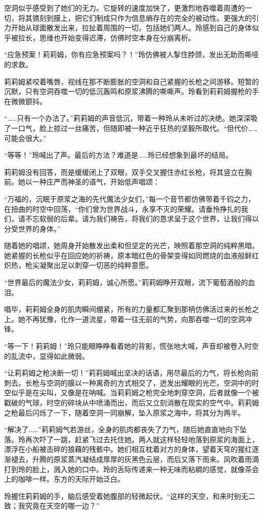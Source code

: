空洞似乎感受到了她们的无力。它旋转的速度加快了，更激烈地吞噬着周遭的一切，将其镌刻到膜上，把它们制成只作为信息熵存在的完全的被动性。更强大的引力开始从球面散发出来，拉扯着周围的一切，包括她们两人。玲感到自己的身体似乎被拉长，思维也开始变得迟滞，仿佛时空本身在分崩离析。

“应急预案！莉莉姆，你有应急预案吗？！”玲仿佛被人掣住脖颈，发出无助而嘶哑的求救。

莉莉姆紧咬着嘴唇，视线在那不断膨胀的空洞和自己紧握的长枪之间游移。短暂的沉默，只有空洞吞噬一切的低沉轰鸣和原浆沸腾的嘶嘶声。玲看到莉莉姆握枪的手在微微颤抖。

“……只有一个办法了。”莉莉姆的声音低沉，带着一种玲从未听过的决绝。她深深吸了一口气，脸上掠过一丝痛苦，但随即被一种近乎狂热的坚毅所取代。“但代价……可能会很大。”

“等等！”玲喊出了声。最后的方法？难道是……玲已经想象到最坏的结局。

莉莉姆没有回答，而是缓缓闭上了双眼，双手交叉握住赤红长枪，将其竖立在胸前。她以一种庄严而神圣的语气，开始低声唱颂：

“万福的，沉眠于原浆之海的先代魔法少女们，”每一个音节都仿佛带着千钧之力，在扭曲的时空中回荡，“你们曾为世界战斗，永享不灭的荣耀。请垂怜挣扎的我们，请不忘软弱的后辈。请为我们祷告，将我们的恳求呈于这个世界，让我们得以分受世界的身体。”

随着她的唱颂，她周身开始散发出柔和但坚定的光芒，映照着那空洞的纯粹黑暗。她紧握的长枪似乎在回应她的祈祷，原本暗红色的骨架变得如同燃烧的血液般鲜红炽热，枪尖凝聚出足以刺穿一切恶的纯粹意愿。

“世界最后的魔法少女，莉莉姆，诚心所愿。”莉莉姆睁开双眼，流下葡萄酒般的血泪。

唱毕，莉莉姆全身的肌肉瞬间绷紧，所有的力量都汇聚到那柄仿佛活过来的长枪之上。她不再犹豫，化作一道流星，带着一往无前的气势，向那吞噬一切的空洞冲锋。

“等一下！莉莉姆！”玲只能眼睁睁看着她的背影，慌张地大喊，声音却被卷入时空的乱流中，显得如此微弱。

“让莉莉姆之枪决断一切！”莉莉姆喊出坚决的话语，用尽最后的力气，将长枪向前刺去。长枪与空洞的膜以一种离奇的方式相交了，迸发出耀眼的光芒。空洞中的时空似乎是在尖叫，又像是在呐喊。当莉莉姆之枪完全地刺穿空洞，后者就像一个被戳破的气球，时空的碎块从中喷涌而出，而后又立刻消散在现实的空气中。莉莉姆之枪最后闪烁了一下，随着空洞一同崩解，坠入原浆之海中，将其分为两半。

“解决了……”莉莉姆气若游丝，全身的肌肉都丧失了力气，随后她直直地向下坠落。玲再次吓了一跳，赶紧飞过去托住她。两人就这样轻轻地落到原浆的海面上，漂浮在小船被击碎的狼藉的残骸中。她们相互枕着对方的身体，望着天穹的猩红逐渐褪去，升腾的原浆蒸汽凝结成厚厚的灰黑色云层，而后又落下雨来。风吹着雨滴打到玲的脸上，溅入她的口中。玲的舌际传递来一种无味而粘稠的感觉，就像茶会上的咖啡一样。东方的天际开始泛白。

玲握住莉莉姆的手，脑后感受着她腹部的轻微起伏。“这样的天空，和来时别无二致；我究竟在天空的哪一边？”
